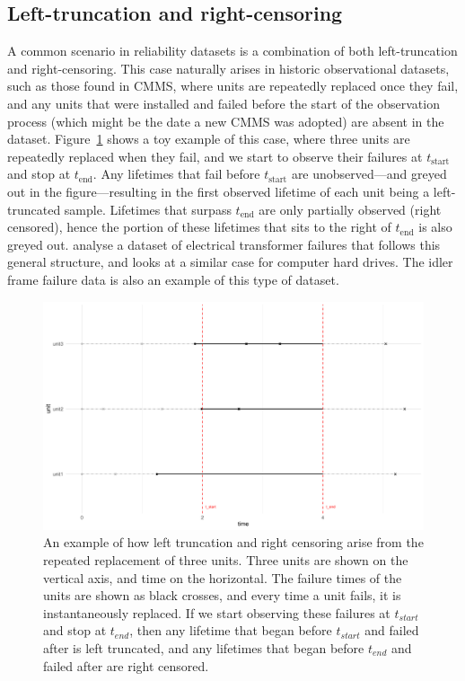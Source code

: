 \subsection{Left-truncation and right-censoring} 

A common scenario in reliability datasets is a combination of both left-truncation and right-censoring. This case naturally arises in historic observational datasets, such as those found in CMMS, where units are repeatedly replaced once they fail, and any units that were installed and failed before the start of the observation process (which might be the date a new CMMS was adopted) are absent in the dataset. Figure~\ref{fig:left_trunc_and_right_cens_example} shows a toy example of this case, where three units are repeatedly replaced when they fail, and we start to observe their failures at $t_{\text{start}}$ and stop at $t_{\text{end}}$. Any lifetimes that fail before $t_{\text{start}}$ are unobserved---and greyed out in the figure---resulting in the first observed lifetime of each unit being a left-truncated sample. Lifetimes that surpass $t_{\text{end}}$ are only partially observed (right censored), hence the portion of these lifetimes that sits to the right of $t_{\text{end}}$ is also greyed out. \citet{hong2009,mitra2013,kundu2016} analyse a dataset of electrical transformer failures that follows this general structure, and \citet{mittman2013} looks at a similar case for computer hard drives. The idler frame failure data is also an example of this type of dataset.

\begin{figure}[h]
    \centering
    \includegraphics[width=1\textwidth]{./figures/left_truncation_w_right_censoring_example.pdf}
    \caption{An example of how left truncation and right censoring arise from the repeated replacement of three units. Three units are shown on the vertical axis, and time on the horizontal. The failure times of the units are shown as black crosses, and every time a unit fails, it is instantaneously replaced. If we start observing these failures at $t_{start}$ and stop at $t_{end}$, then any lifetime that began before $t_{start}$ and failed after is left truncated, and any lifetimes that began before $t_{end}$ and failed after are right censored.}
    \label{fig:left_trunc_and_right_cens_example}
\end{figure}

